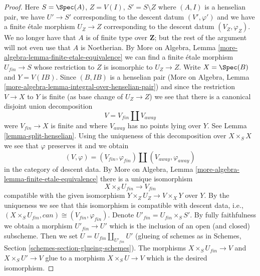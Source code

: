 \begin{proof}
\medskip\noindent
Here $S = \Spec(A)$, $Z = V(I)$, $S' = S \setminus Z$ where
$(A, I)$ is a henselian pair, we have $U' \to S'$ corresponding
to the descent datum $(V', \varphi')$ and we have a finite \'etale
morphism $U_Z \to Z$ corresponding to the descent datum
$(V_Z, \varphi_Z)$. We no longer have that $A$ is of finite type
over $\mathbf{Z}$; but the rest of the argument will not even use
that $A$ is Noetherian.
By More on Algebra, Lemma \ref{more-algebra-lemma-finite-etale-equivalence}
we can find a finite \'etale morphism $U_{fin} \to S$ whose
restriction to $Z$ is isomorphic to $U_Z \to Z$.
Write $X = \Spec(B)$ and $Y = V(IB)$. Since $(B, IB)$ is a henselian pair
(More on Algebra, Lemma \ref{more-algebra-lemma-integral-over-henselian-pair})
and since the restriction $V \to X$ to $Y$
is finite (as base change of $U_Z \to Z$) we see that
there is a canonical disjoint union decomposition
$$
V = V_{fin} \amalg V_{away}
$$
were $V_{fin} \to X$ is finite and where $V_{away}$ has no
points lying over $Y$. See Lemma \ref{lemma-split-henselian}.
Using the uniqueness of this decomposition over $X \times_S X$
we see that $\varphi$ preserves it and we obtain
$$
(V, \varphi) = (V_{fin}, \varphi_{fin}) \amalg (V_{away}, \varphi_{away})
$$
in the category of descent data.
By More on Algebra, Lemma \ref{more-algebra-lemma-finite-etale-equivalence}
there is a unique isomorphism
$$
X \times_S U_{fin} \longrightarrow V_{fin}
$$
compatible with the given isomorphism $Y \times_Z U_Z \to V \times_X Y$
over $Y$.
By the uniqueness we see that this isomorphism is compatible
with descent data, i.e.,
$(X \times_S U_{fin}, can) \cong (V_{fin}, \varphi_{fin})$.
Denote $U'_{fin} = U_{fin} \times_S S'$. By fully faithfulness
we obtain a morphism $U'_{fin} \to U'$ which is
the inclusion of an open (and closed) subscheme.
Then we set $U = U_{fin} \amalg_{U'_{fin}} U'$ (glueing of schemes as
in Schemes, Section \ref{schemes-section-glueing-schemes}).
The morphisms $X \times_S U_{fin} \to V$ and
$X \times_S U' \to V$ glue to a morphism $X \times_S U \to V$
which is the desired isomorphism.
\end{proof}
